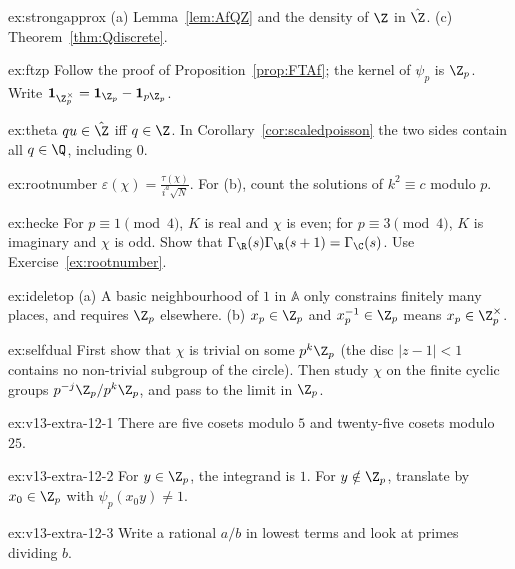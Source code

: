 \begin{hint}{ex:strongapprox}
(a) Lemma~\ref{lem:AfQZ} and the density of $\Z$ in $\hat{\Z}$. (c) Theorem~\ref{thm:Qdiscrete}.
\end{hint}
\begin{hint}{ex:ftzp}
Follow the proof of Proposition~\ref{prop:FTAf}; the kernel of $\psi_p$ is $\Z_p$. Write $\mathbf 1_{\Z_p^\times}=\mathbf 1_{\Z_p}-\mathbf 1_{p\Z_p}$.
\end{hint}
\begin{hint}{ex:theta}
$qu\in\hat{\Z}$ iff $q\in\Z$. In Corollary~\ref{cor:scaledpoisson} the two sides contain all $q\in\Q$, including $0$.
\end{hint}
\begin{hint}{ex:rootnumber}
$\varepsilon(\chi)=\frac{\tau(\chi)}{i^a\sqrt N}$. For (b), count the solutions of $k^2\equiv c$ modulo $p$.
\end{hint}
\begin{hint}{ex:hecke}
For $p\equiv1\pmod4$, $K$ is real and $\chi$ is even; for $p\equiv3\pmod4$, $K$ is imaginary and $\chi$ is odd. Show that $\Gamma_\R(s)\Gamma_\R(s+1)=\Gamma_\C(s)$.
Use Exercise~\ref{ex:rootnumber}.
\end{hint}
\begin{hint}{ex:ideletop}
(a) A basic neighbourhood of $1$ in $\mathbb{A}$ only constrains finitely many places, and requires $\Z_p$ elsewhere. (b) $x_p\in\Z_p$ and $x_p^{-1}\in\Z_p$ means
$x_p\in\Z_p^\times$.
\end{hint}
\begin{hint}{ex:selfdual}
First show that $\chi$ is trivial on some $p^k\Z_p$ (the disc $|z-1|<1$ contains no non-trivial subgroup of the circle). Then study $\chi$ on the finite cyclic
groups $p^{-j}\Z_p/p^k\Z_p$, and pass to the limit in $\Z_p$.
\end{hint}

\begin{hint}{ex:v13-extra-12-1}
There are five cosets modulo $5$ and twenty-five cosets modulo $25$.
\end{hint}

\begin{hint}{ex:v13-extra-12-2}
For $y\in\Z_p$, the integrand is $1$. For $y\notin\Z_p$, translate by $x_0\in\Z_p$ with $\psi_p(x_0y)\ne1$.
\end{hint}

\begin{hint}{ex:v13-extra-12-3}
Write a rational $a/b$ in lowest terms and look at primes dividing $b$.
\end{hint}

